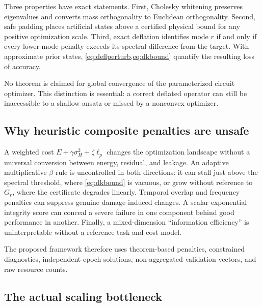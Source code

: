 \documentclass{ieeeaccess}
\begin{document}
Three properties have exact statements. First, Cholesky whitening preserves eigenvalues and converts mass orthogonality to Euclidean orthogonality. Second, safe padding places artificial states above a certified physical bound for any positive optimization scale. Third, exact deflation identifies mode $r$ if and only if every lower-mode penalty exceeds its spectral difference from the target. With approximate prior states, \cref{eq:deflperturb,eq:dkbound} quantify the resulting loss of accuracy.

No theorem is claimed for global convergence of the parameterized circuit optimizer. This distinction is essential: a correct deflated operator can still be inaccessible to a shallow ansatz or missed by a nonconvex optimizer.

\subsection{Why heuristic composite penalties are unsafe}

A weighted cost $E+\gamma\sigma_H^2+\zeta\ell_p$ changes the optimization landscape without a universal conversion between energy, residual, and leakage. An adaptive multiplicative $\beta$ rule is uncontrolled in both directions: it can stall just above the spectral threshold, where \cref{eq:dkbound} is vacuous, or grow without reference to $G_r$, where the certificate degrades linearly. Temporal overlap and frequency penalties can suppress genuine damage-induced changes. A scalar exponential integrity score can conceal a severe failure in one component behind good performance in another. Finally, a mixed-dimension ``information efficiency'' is uninterpretable without a reference task and cost model.

The proposed framework therefore uses theorem-based penalties, constrained diagnostics, independent epoch solutions, non-aggregated validation vectors, and raw resource counts.

\subsection{The actual scaling bottleneck}
\end{document}
